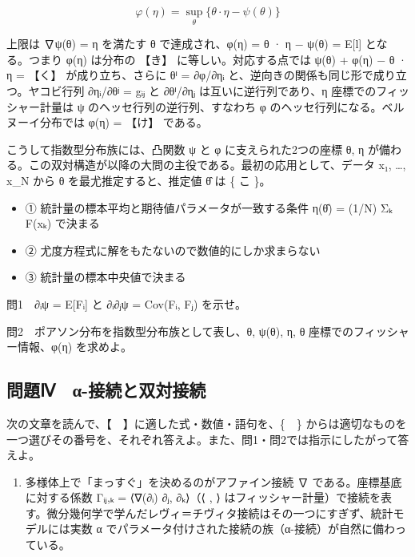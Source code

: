 \documentclass[
  10pt,
  a4paper,
]{article}
\providecommand{\tightlist}{%
  \setlength{\itemsep}{0pt}\setlength{\parskip}{0pt}}
\begin{document}
\[\varphi(\eta) = \sup_{\theta} \big\{ \theta \cdot \eta - \psi(\theta) \big\}\]

上限は ∇ψ(θ) = η を満たす θ で達成され、φ(η) = θ · η − ψ(θ) = E{[}l{]}
となる。つまり φ(η) は分布の 【き】 に等しい。対応する点では ψ(θ) + φ(η)
− θ · η = 【く】 が成り立ち、さらに θ{\fallbackfont ⁱ} =
∂φ/∂η{\fallbackfont ᵢ} と、逆向きの関係も同じ形で成り立つ。ヤコビ行列
∂η{\fallbackfont ᵢ}/∂θ{\fallbackfont ʲ} = g{\fallbackfont ᵢⱼ} と
∂θ{\fallbackfont ⁱ}/∂η{\fallbackfont ⱼ} は互いに逆行列であり、η
座標でのフィッシャー計量は ψ のヘッセ行列の逆行列、すなわち φ
のヘッセ行列になる。ベルヌーイ分布では φ(η) = 【け】 である。

こうして指数型分布族には、凸関数 ψ と φ に支えられた2つの座標 θ, η
が備わる。この双対構造が以降の大問の主役である。最初の応用として、データ
x{\fallbackfont ₁}, \ldots, x\_N から θ を最尤推定すると、推定値
{\fallbackfont θ̂} は \{ こ \}。

\begin{itemize}
\tightlist
\item
  ① 統計量の標本平均と期待値パラメータが一致する条件
  η({\fallbackfont θ̂}) = (1/N) Σ{\fallbackfont ₖ} F(x{\fallbackfont ₖ})
  で決まる
\item
  ② 尤度方程式に解をもたないので数値的にしか求まらない
\item
  ③ 統計量の標本中央値で決まる
\end{itemize}

問1　∂{\fallbackfont ᵢ}ψ = E{[}F{\fallbackfont ᵢ}{]} と
∂{\fallbackfont ᵢ}∂{\fallbackfont ⱼ}ψ = Cov(F{\fallbackfont ᵢ},
F{\fallbackfont ⱼ}) を示せ。

問2　ポアソン分布を指数型分布族として表し、θ, ψ(θ), η, θ
座標でのフィッシャー情報、φ(η) を求めよ。

\hypertarget{ux554fux984cux2173-ux3b1-ux63a5ux7d9aux3068ux53ccux5bfeux63a5ux7d9a}{%
\subsection{問題Ⅳ　α-接続と双対接続}\label{ux554fux984cux2173-ux3b1-ux63a5ux7d9aux3068ux53ccux5bfeux63a5ux7d9a}}

次の文章を読んで、【　】に適した式・数値・語句を、\{　\}
からは適切なものを一つ選びその番号を、それぞれ答えよ。また、問1・問2では指示にしたがって答えよ。

\begin{enumerate}
\def\labelenumi{(\arabic{enumi})}
\tightlist
\item
  多様体上で「まっすぐ」を決めるのがアファイン接続 ∇
  である。座標基底に対する係数 Γ{\fallbackfont ᵢⱼ},{\fallbackfont ₖ} =
  {\fallbackfont ⟨}∇(∂{\fallbackfont ᵢ}) ∂{\fallbackfont ⱼ},
  ∂{\fallbackfont ₖ⟩}（{\fallbackfont ⟨} , {\fallbackfont ⟩}
  はフィッシャー計量）で接続を表す。微分幾何学で学んだレヴィ＝チヴィタ接続はその一つにすぎず、統計モデルには実数
  α でパラメータ付けされた接続の族（α-接続）が自然に備わっている。
\end{enumerate}
\end{document}
